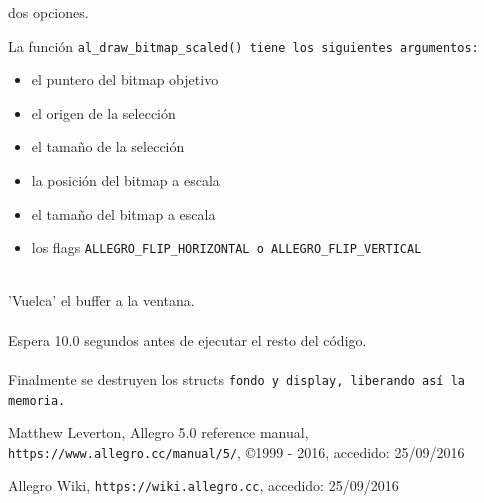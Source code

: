 \documentclass[11pt]{article}
\begin{document}
dos opciones.

La función \tt al\_draw\_bitmap\_scaled() \rm tiene los siguientes argumentos:
\begin{itemize}
\item el puntero del bitmap objetivo
\item el origen de la selección
\item el tamaño de la selección
\item la posición del bitmap a escala
\item el tamaño del bitmap a escala
\item los flags \tt ALLEGRO\_FLIP\_HORIZONTAL\rm \ o \tt ALLEGRO\_FLIP\_VERTICAL\rm
\end{itemize}


\\

'Vuelca' el buffer a la ventana.\\

\\

Espera 10.0 segundos antes de ejecutar el resto del código.\\

\\

Finalmente se destruyen los structs \tt fondo \rm y \tt display\rm , liberando así la memoria.
\vfill
\begin{thebibliography}{9}
     Matthew Leverton, 
     Allegro 5.0 reference manual, 
     \verb!https://www.allegro.cc/manual/5/!, 
     \copyright 1999 - 2016,
     accedido: 25/09/2016
     
     Allegro Wiki,
     \verb!https://wiki.allegro.cc!,
     accedido: 25/09/2016
\end{thebibliography}
\end{document}
